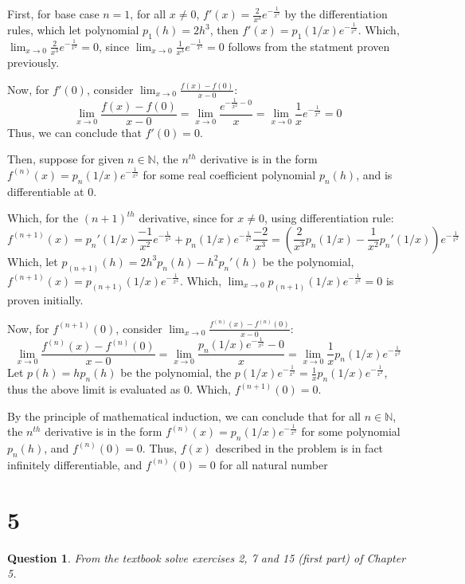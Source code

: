 \documentclass{article}
\newtheorem{question}{Question}
\begin{document}
\hfill

First, for base case $n=1$, for all $x\neq 0$, $f'(x)=\frac{2}{x^3}e^{-\frac{1}{x^2}}$ by the differentiation rules, which let polynomial $p_1(h)=2h^3$, then $f'(x)=p_1(1/x)e^{-\frac{1}{x^2}}$. 
Which, $\lim_{x\rightarrow 0}\frac{2}{x^3}e^{-\frac{1}{x^2}}=0$, since $\lim_{x\rightarrow 0}\frac{1}{x^3}e^{-\frac{1}{x^2}}=0$ follows from the statment proven previously.

Now, for $f'(0)$, consider $\lim_{x\rightarrow 0}\frac{f(x)-f(0)}{x-0}$:
$$\lim_{x\rightarrow 0}\frac{f(x)-f(0)}{x-0}=\lim_{x\rightarrow 0}\frac{e^{-\frac{1}{x^2}-0}}{x} = \lim_{x\rightarrow 0}\frac{1}{x}e^{-\frac{1}{x^2}}=0$$
Thus, we can conclude that $f'(0)=0$.

\hfill

Then, suppose for given $n\in\mathbb{N}$, the $n^{th}$ derivative is in the form $f^{(n)}(x)=p_n(1/x)e^{-\frac{1}{x^2}}$ for some real coefficient polynomial $p_n(h)$, and is differentiable at $0$.

Which, for the $(n+1)^{th}$ derivative, since for $x\neq 0$, using differentiation rule:
$$f^{(n+1)}(x)=p_n'(1/x)\frac{-1}{x^2}e^{-\frac{1}{x^2}}+p_n(1/x)e^{-\frac{1}{x^2}}\frac{-2}{x^3} = (\frac{2}{x^3}p_n(1/x)-\frac{1}{x^2}p_n'(1/x))e^{-\frac{1}{x^2}}$$
Which, let $p_{(n+1)}(h)=2h^3p_n(h)-h^2p_n'(h)$ be the polynomial, $f^{(n+1)}(x)=p_{(n+1)}(1/x)e^{-\frac{1}{x^2}}$. Which, $\lim_{x\rightarrow 0}p_{(n+1)}(1/x)e^{-\frac{1}{x^2}}=0$ is proven initially.

Now, for $f^{(n+1)}(0)$, consider $\lim_{x\rightarrow 0}\frac{f^{(n)}(x)-f^{(n)}(0)}{x-0}$:
$$\lim_{x\rightarrow 0}\frac{f^{(n)}(x)-f^{(n)}(0)}{x-0} =\lim_{x\rightarrow 0}\frac{p_n(1/x)e^{-\frac{1}{x^2}}-0}{x} = \lim_{x\rightarrow 0}\frac{1}{x}p_n(1/x)e^{-\frac{1}{x^2}}$$
Let $p(h)=hp_n(h)$ be the polynomial, the $p(1/x)e^{-\frac{1}{x^2}}=\frac{1}{x}p_n(1/x)e^{-\frac{1}{x^2}}$, thus the above limit is evaluated as $0$.
Which, $f^{(n+1)}(0)=0$.

\hfill

By the principle of mathematical induction, we can conclude that for all $n\in\mathbb{N}$, the $n^{th}$ derivative is in the form $f^{(n)}(x)=p_n(1/x)e^{-\frac{1}{x^2}}$ for some polynomial $p_n(h)$, 
and $f^{(n)}(0)=0$. Thus, $f(x)$ described in the problem is in fact infinitely differentiable, and $f^{(n)}(0)=0$ for all natural number

\break

\section*{5}
\begin{myBox}[]{}
    \begin{question}
        From the textbook solve exercises 2, 7 and 15 (first part) of Chapter 5.
    \end{question}
\end{myBox}
\end{document}
